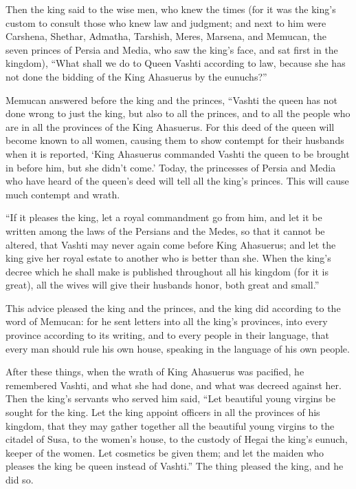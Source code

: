 \myverse{}Then the king said to the wise men, who knew the times (for it
was the king’s custom to consult those who knew law and judgment;
\myverse{}and next to him were Carshena, Shethar, Admatha, Tarshish, Meres, Marsena,
and Memucan, the seven princes of Persia and Media, who saw the king’s face, and sat first in the kingdom),
\myverse{}“What shall we do to Queen Vashti according to law, because she has not done
the bidding of the King Ahasuerus by the eunuchs?”

\myverse{}Memucan answered before the king and the princes, “Vashti the
queen has not done wrong to just the king, but also to all the princes, and to all the people who are
in all the provinces of the King Ahasuerus.
\myverse{}For this deed of the queen will become known to all women, causing them to
show contempt for their husbands when it is reported, ‘King Ahasuerus commanded Vashti the queen to be
brought in before him, but she didn’t come.’
\myverse{}Today, the princesses of Persia and Media who have heard of the queen’s deed
will tell all the king’s princes. This will cause much contempt and wrath.

\myverse{}“If it pleases the king, let a royal commandment go from him,
and let it be written among the laws of the Persians and the Medes, so that it cannot be altered, that
Vashti may never again come before King Ahasuerus; and let the king give her royal estate to another who
is better than she.
\myverse{}When the king’s decree which he shall make is published throughout all his
kingdom (for it is great), all the wives will give their husbands honor, both great and small.”

\myverse{}This advice pleased the king and the princes, and the king did
according to the word of Memucan:
\myverse{}for he sent letters into all the king’s provinces, into every province according
to its writing, and to every people in their language, that every man should rule his own house, speaking
in the language of his own people.


\mychapter{}\myverse*{}After these things, when the wrath of King Ahasuerus was pacified,
he remembered Vashti, and what she had done, and what was decreed against her.
\myverse{}Then the king’s servants who served him said, “Let beautiful young virgins be
sought for the king.
\myverse{}Let the king appoint officers in all the provinces of his kingdom, that they
may gather together all the beautiful young virgins to the citadel of Susa, to the women’s house, to the
custody of Hegai the king’s eunuch, keeper of the women. Let cosmetics be given them;
\myverse{}and let the maiden who pleases the king be queen instead of Vashti.” The thing
pleased the king, and he did so.

